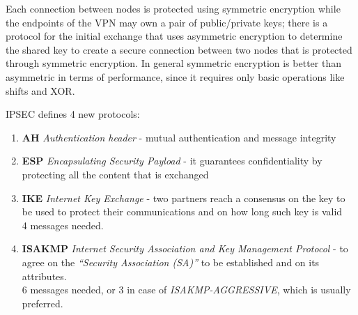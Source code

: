 Each connection between nodes is protected using symmetric encryption while
the endpoints of the VPN may own a pair of public/private keys;
there is a protocol for the initial exchange that uses asymmetric encryption to
determine the shared key to create a secure connection between two nodes
that is protected through symmetric encryption.
In general symmetric encryption is better than asymmetric in terms of performance,
since it requires only basic operations like shifts and XOR.\nl

IPSEC defines 4 new protocols:
\begin{enumerate}
   \item \textbf{AH} \textit{Authentication header }- mutual authentication and message integrity
   \item \textbf{ESP} \textit{Encapsulating Security Payload }- it guarantees confidentiality by protecting all the content that is exchanged
   \item \textbf{IKE} \textit{Internet Key Exchange }- two partners reach a consensus on the key to be used to protect their communications and on how long such key is valid\\
   4 messages needed.
   \item \textbf{ISAKMP} \textit{Internet Security Association and Key Management Protocol }- to agree on the \textit{“Security Association (SA)”} to be established and on its attributes.\\
   6 messages needed, or 3 in case of \textit{ISAKMP-AGGRESSIVE}, which is usually preferred.
\end{enumerate}

